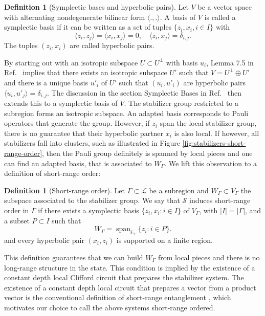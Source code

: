\documentclass[aps,pra,reprint,superscriptaddress]{revtex4-2}
\newcommand{\cL}{{\mathcal L}}
\newcommand{\cS}{{\mathcal S}}
\renewcommand\d{\delta}
\newcommand\G{\Gamma}
\theoremstyle{definition}
\newtheorem{definition}[theorem]{Definition}
\theoremstyle{remark}
\begin{document}
\begin{definition}[Symplectic bases and hyperbolic pairs]
    Let $V$ be a vector space with alternating nondegenerate bilinear form
    $\langle.,.\rangle$. A
    basis of $V$ is called a symplectic basis if it can be written as a set of tuples $\{z_i,x_i, i \in I \}$ with 
    \begin{equation} 
                \langle z_i,z_j\rangle=\langle x_i,x_j\rangle=0,
                  \quad
                    \langle z_i,x_j\rangle=\delta_{i,j}.
    \end{equation}
    The tuples $(z_i,x_i)$ are called hyperbolic pairs.
\end{definition}
By starting out with an isotropic subspace $U \subset U^\perp$ with basis $u_i$, Lemma 7.5 in Ref.~\cite{Taylor1992}
implies that there exists an isotropic subspace $U'$ such that $V = U^\perp
\oplus U'$ and there is a unique basis $u'_i$ of $U'$ such that $(u_i,u'_i)$
are hyperbolic pairs $\langle u_i,u'_j \rangle = \d_{i,j}$. The
discussion in the section Symplectic Bases in Ref.~\cite{Taylor1992} then extends
this to a symplectic basis of $V$.
The stabilizer group restricted to a subregion forms an isotropic subspace. An adapted basis corresponds to Pauli operators that generate the group. However, if $z_i$ span the local stabilizer group, there is no guarantee that their hyperbolic partner $x_i$ is also local. If however, all stabilizers fall into clusters, such as illustrated in Figure \ref{fig:stabilizers-short-range-order}, then the Pauli group definitely is spanned by local pieces and one can find an adapted basis, that is associated to $W_\G$. We lift this observation to a definition of short-range order:

\begin{definition}[Short-range order]\label{def:short_range_order}
    Let $\G \subset \cL$ be a subregion and $W_\G \subset V_\G$ the subspace associated to the stabilizer group. We say that $\cS$ induces short-range order in $\G$ if there exists 
    a symplectic basis $\{z_i,x_i : i\in I\}$ of $V_\Gamma$, with
    $|I|=|\Gamma|$, and a subset $P\subset I$
        such that
    \begin{equation}
        W_\Gamma=\operatorname{span}_{\mathbb F_2}\{z_i : i\in P\}.
    \end{equation}
    and every hyperbolic pair $(x_i,z_i)$ is supported on a finite region.
\end{definition}
This definition guarantees that we can build $W_\G$ from local pieces and there is no long-range structure in the state. This condition is implied by the existence of a constant depth local Clifford circuit that prepares the stabilizer system. The existence of a constant depth local circuit that prepares a vector from a product vector is the conventional definition of short-range entanglement \cite{Chen:2010gda}, which motivates our choice to call the above systems short-range ordered.
\end{document}
